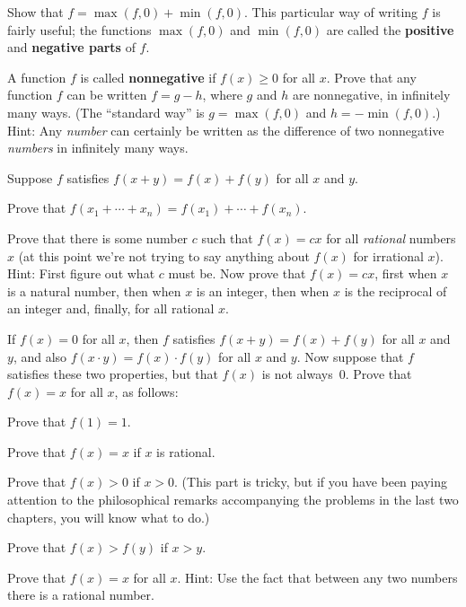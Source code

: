 \begin{letters}
\item Show that $f = \max(f,0) + \min(f,0)$. This particular way of writing
$f$ is fairly useful; the functions $\max(f,0)$ and $\min(f,0)$ are called the
\textbf{positive} and \textbf{negative parts} of $f$.
\item A function $f$ is called \textbf{nonnegative} if $f(x) \geq 0$ for all
$x$. Prove that any function $f$ can be written $f = g - h$, where $g$ and $h$
are nonnegative, in infinitely many ways. (The ``standard way'' is
$g = \max(f,0)$ and $h = -\min(f,0)$.) Hint: Any \emph{number} can certainly
be written as the difference of two nonnegative \emph{numbers} in infinitely
many ways.
\end{letters}

 Suppose $f$ satisfies $f(x+y)=f(x)+f(y)$ for all $x$ and $y$.
\begin{letters}
\item Prove that $f(x_1 + \cdots + x_n) = f(x_1) + \cdots + f(x_n)$.
\item Prove that there is some number $c$ such that $f(x)=cx$ for all
\emph{rational} numbers $x$ (at this point we're not trying to say anything
about $f(x)$ for irrational $x$). Hint: First figure out what $c$ must be. Now
prove that $f(x)=cx$, first when $x$ is a natural number, then when $x$ is an
integer, then when $x$ is the reciprocal of an integer and, finally, for all
rational $x$.
\end{letters}

 If $f(x)=0$ for all $x$, then $f$ satisfies
$f(x+y)=f(x)+f(y)$ for all $x$ and $y$, and also $f(x \cdot y)=f(x) \cdot f(y)$
for all $x$ and $y$. Now suppose that $f$ satisfies these two properties, but
that $f(x)$ is not always~$0$. Prove that $f(x)=x$ for all $x$, as follows:
\begin{letters}
\item Prove that $f(1)=1$.
\item Prove that $f(x)=x$ if $x$ is rational.
\item Prove that $f(x)>0$ if $x>0$. (This part is tricky, but if you have been
paying attention to the philosophical remarks accompanying the problems in the
last two chapters, you will know what to do.)
\item Prove that $f(x)>f(y)$ if $x>y$.
\item Prove that $f(x)=x$ for all $x$. Hint: Use the fact that between any two
numbers there is a rational number.
\end{letters}

